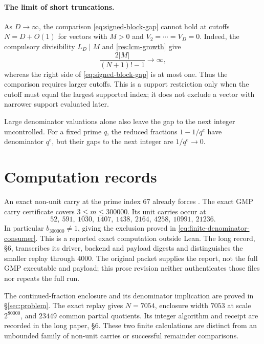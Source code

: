 \documentclass[11pt]{article}
\begin{document}
\paragraph{The limit of short truncations.}
\label{sec:nogo}\label{sec:adjacent-unit-no-go}
As $D\to\infty$, the comparison \eqref{eq:signed-block-gap} cannot hold
at cutoffs $N=D+O(1)$ for vectors with $M>0$ and
$V_2=\cdots=V_D=0$. Indeed, the compulsory divisibility $L_D\mid M$ and
\eqref{res:lcm-growth} give
\[
\frac{2|M|}{(N+1)!-1}\longrightarrow\infty,
\]
whereas the right side of \eqref{eq:signed-block-gap} is at most one.
Thus the comparison requires larger cutoffs. This is a support restriction
only when the cutoff must equal the largest supported index; it does not
exclude a vector with narrower support evaluated later.

Large denominator valuations alone also leave the gap to the next integer
uncontrolled. For a fixed prime $q$, the reduced fractions $1-1/q^e$ have
denominator $q^e$, but their gaps to the next integer are $1/q^e\to0$.  

\section{Computation records}\label{sec:finite}

An exact non-unit carry at the prime index $67$ already forces
.
The exact GMP carry certificate covers $3\le m\le300000$.  Its unit carries
occur at
\[
52,\ 591,\ 1030,\ 1407,\ 1438,\ 2164,\ 4258,\ 10991,\ 21236.
\]
In particular $b_{300000}\ne1$, giving the exclusion proved in
\eqref{eq:finite-denominator-consumer}. This is a reported exact computation
outside Lean. The long record, \S6, transcribes its driver, backend and payload
digests and distinguishes the smaller replay through $4000$. The original
packet supplies the report, not the full GMP executable and payload; this
prose revision neither authenticates those files nor repeats the full run.

The continued-fraction enclosure and its denominator implication are proved
in \S\ref{sec:problem}. The exact replay gives $N=7054$, enclosure width
$7053$ at scale $2^{80000}$, and $23449$ common partial quotients. Its
integer algorithm and receipt are recorded in the long paper, \S6.
These two finite calculations are distinct from an unbounded family of
non-unit carries or successful remainder comparisons.
\end{document}
